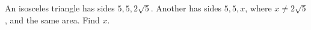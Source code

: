 An isosceles triangle has sides $5,5,2\sqrt5$. Another has sides $5,5,x$, where $x\ne2\sqrt5$, and the same area. Find $x$.
